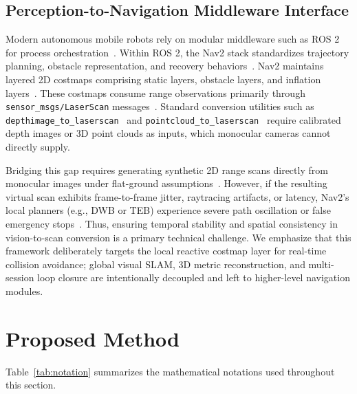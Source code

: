 \documentclass{ieeeaccess}
\begin{document}
\subsection{Perception-to-Navigation Middleware Interface}
Modern autonomous mobile robots rely on modular middleware such as ROS 2 for process orchestration~\cite{quigley_2009_ros,macenski_2022_robot}. Within ROS 2, the Nav2 stack standardizes trajectory planning, obstacle representation, and recovery behaviors~\cite{macenski_2020_the,macenski_2023_from}. Nav2 maintains layered 2D costmaps comprising static layers, obstacle layers, and inflation layers~\cite{opennavigationllc_2023_costmap}. These costmaps consume range observations primarily through \texttt{sensor\_msgs/LaserScan} messages~\cite{openrobotics_sensor_msgslaserscan}. Standard conversion utilities such as \texttt{depthimage\allowbreak\_to\allowbreak\_laserscan}~\cite{openrobotics_2020_depthimage_to_laserscan} and \texttt{pointcloud\allowbreak\_to\allowbreak\_laserscan}~\cite{openrobotics_2015_pointcloud_to_laserscan} require calibrated depth images or 3D point clouds as inputs, which monocular cameras cannot directly supply.

Bridging this gap requires generating synthetic 2D range scans directly from monocular images under flat-ground assumptions~\cite{moravec_1985_high,fox_1997_the}. However, if the resulting virtual scan exhibits frame-to-frame jitter, raytracing artifacts, or latency, Nav2's local planners (e.g., DWB or TEB) experience severe path oscillation or false emergency stops~\cite{fox_1997_the,opennavigationllc_2025_denoise}. Thus, ensuring temporal stability and spatial consistency in vision-to-scan conversion is a primary technical challenge. We emphasize that this framework deliberately targets the local reactive costmap layer for real-time collision avoidance; global visual SLAM, 3D metric reconstruction, and multi-session loop closure are intentionally decoupled and left to higher-level navigation modules.

\section{Proposed Method}
\label{sec:proposed_method}

Table~\ref{tab:notation} summarizes the mathematical notations used throughout this section.
\end{document}
